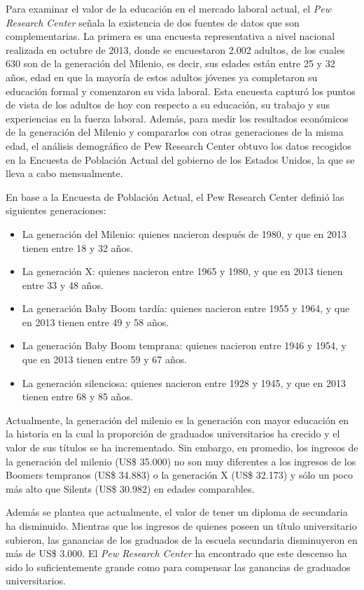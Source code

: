 Para examinar el valor de la educación en el mercado laboral actual, el \textit{Pew Research Center} señala la existencia de dos fuentes de datos que son complementarias. La primera es una encuesta representativa a nivel nacional realizada en octubre de 2013, donde se encuestaron 2.002 adultos, de los cuales 630 son de la generación del Milenio, es decir, sus edades están entre 25 y 32 años, edad en que la mayoría de estos adultos jóvenes ya completaron su educación formal y comenzaron su vida laboral. Esta encuesta capturó los puntos de vista de los adultos de hoy con respecto a su educación, su trabajo y sus experiencias en la fuerza laboral.
Además, para medir los resultados económicos de la generación del Milenio y compararlos con otras generaciones de la misma edad, el análisis demográfico de Pew Research Center obtuvo los datos recogidos en la Encuesta de Población Actual del gobierno de los Estados Unidos, la que se lleva a cabo mensualmente. 

En base a la Encuesta de Población Actual, el Pew Research Center definió las siguientes generaciones:
\begin{itemize}
\item La generación del Milenio: quienes nacieron después de 1980, y que en 2013 tienen entre 18 y 32 años.
\item La generación X: quienes nacieron entre 1965 y 1980, y que en 2013 tienen entre 33 y 48 años.
\item La generación Baby Boom tardía: quienes nacieron entre 1955 y 1964, y que en 2013 tienen entre 49 y 58 años.
\item La generación Baby Boom temprana: quienes nacieron entre 1946 y 1954, y que en 2013 tienen entre 59 y 67 años.
\item La generación silenciosa: quienes nacieron entre 1928 y 1945, y que en 2013 tienen entre 68 y 85 años.
\end{itemize}

Actualmente, la generación del milenio es la generación con mayor educación en la historia en la cual la proporción de graduados universitarios ha crecido y el valor de sus títulos se ha incrementado. Sin embargo, en promedio, los ingresos de la generación del milenio (US\$ 35.000) no son muy diferentes a los ingresos de los Boomers tempranos (US\$ 34.883) o la generación X (US\$ 32.173) y sólo un poco más alto que Silents (US\$ 30.982) en edades comparables.

Además se plantea que actualmente, el valor de tener un diploma de secundaria ha disminuido. Mientras que los ingresos de quienes poseen un título universitario subieron, las ganancias de los graduados de la escuela secundaria disminuyeron en más de US\$ 3.000. El \textit{Pew Research Center} ha encontrado que este descenso ha sido lo suficientemente grande como para compensar las ganancias de graduados universitarios. 


